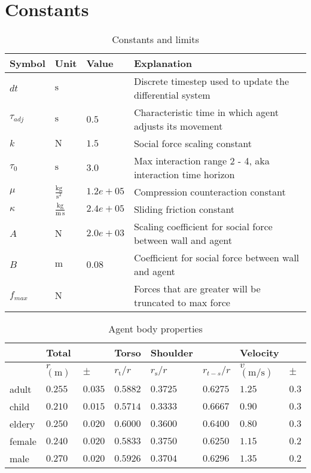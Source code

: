 \section{Constants}

\begin{table}[H]
\begin{tabular}{ lll|l }
\hline
Symbol         & Unit & Value & Explanation \\
\hline
\hline
$ dt $ & $ \mathrm{s} $ &  & Discrete timestep used to update the differential system \\
\hline
\hline
$ \tau_{adj} $ & $ \mathrm{s} $ & $ 0.5 $ & Characteristic time in which agent adjusts its movement \\
$ k $          & $ \mathrm{N} $ & $ 1.5 $ & Social force scaling constant \\
$ \tau_{0} $   & $ \mathrm{s} $ & $ 3.0 $ & Max interaction range 2 - 4, aka interaction time horizon \\
$ \mu $        & $ \mathrm{\frac{kg}{s^{2}}} $ & $ 1.2e+05 $ & Compression counteraction constant \\
$ \kappa $     & $ \mathrm{\frac{kg}{m\,s}} $ & $ 2.4e+05 $ & Sliding friction constant \\
$ A $          & $ \mathrm{N} $ & $ 2.0e+03 $ & Scaling coefficient for social force between wall and agent \\
$ B $          & $ \mathrm{m} $ & $ 0.08 $ & Coefficient for social force between wall and agent \\
\hline
\hline
$ f_{max} $    & $ \mathrm{N} $ &  & Forces that are greater will be truncated to max force \\
\hline
\end{tabular} 
\caption{Constants and limits}
\end{table}

\begin{table}[H]
\begin{tabular}{l|lllllll}
& Total && Torso & Shoulder &  & Velocity &  \\
\hline
& $ r $ $ (\mathrm{m}) $ & $ \pm $ & $ r_{\text{t}} / r $ & $ r_{\text{s}} / r $ & $ r_{t-s} / r $ & $ v $ $ (\mathrm{m} / \mathrm{s}) $ & $ \pm $ \\
\hline\hline
adult & $ 0.255 $ & $ 0.035 $ & $ 0.5882 $ & $ 0.3725 $ & $ 0.6275 $ & $ 1.25 $ & $ 0.3 $ \\
child & $ 0.210 $ & $ 0.015 $ & $ 0.5714 $ & $ 0.3333 $ & $ 0.6667 $ & $ 0.90 $ & $ 0.3 $ \\
eldery & $ 0.250 $ & $ 0.020 $ & $ 0.6000 $ & $ 0.3600 $ & $ 0.6400 $ & $ 0.80 $ & $ 0.3 $ \\
female & $ 0.240 $ & $ 0.020 $ & $ 0.5833 $ & $ 0.3750 $ & $ 0.6250 $ & $ 1.15 $ & $ 0.2 $ \\
male & $ 0.270 $ & $ 0.020 $ & $ 0.5926 $ & $ 0.3704 $ & $ 0.6296 $ & $ 1.35 $ & $ 0.2 $ \\
\hline
\end{tabular} 
\caption{Agent body properties}
\end{table} 

